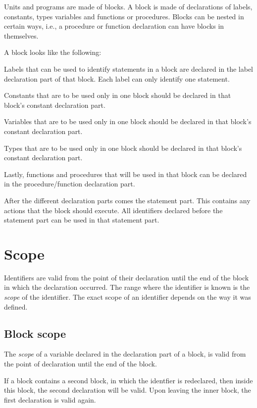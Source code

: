 \documentclass{report}
\begin{document}
Units and programs are made of blocks. A block is made of declarations of 
labels, constants, types variables and functions or procedures. Blocks can
be nested in certain ways, i.e., a procedure or function declaration can
have blocks in themselves.

A block looks like the following:



Labels that can be used to identify statements in a block are declared in
the label declaration part of that block. Each label can only identify one
statement.

Constants that are to be used only in one block should be declared in that
block's constant declaration part.

Variables that are to be used only in one block should be declared in that
block's constant declaration part.

Types that are to be used only in one block should be declared in that
block's constant declaration part.

Lastly, functions and procedures that will be used in that block can be
declared in the procedure/function declaration part.

After the different declaration parts comes the statement part. This
contains any actions that the block should execute.
All identifiers declared before the statement part can be used in that 
statement part.

\section{Scope}

Identifiers are valid from the point of their declaration until the end of
the block in which the declaration occurred. The range where the identifier
is known is the {\em scope} of the identifier. The exact scope of an
identifier depends on the way it was defined.

\subsection{Block scope}
The {\em scope} of a variable declared in the declaration part of a block,
is valid from the point of declaration until the end of the block.

If a block contains a second block, in which the identfier is
redeclared, then inside this block, the second declaration will be valid.
Upon leaving the inner block, the first declaration is valid again.
\end{document}
